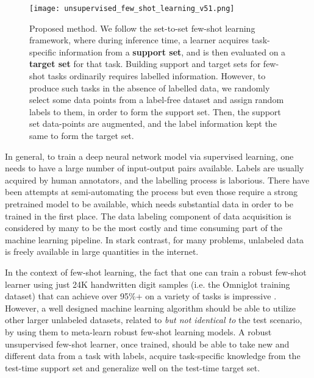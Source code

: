 \documentclass{article}
\begin{document}
\begin{figure}[ht]
    \centering
    \texttt{[image: unsupervised\_few\_shot\_learning\_v51.png]}
    \caption{Proposed method.  We follow the set-to-set \cite{vinyals2016matching} few-shot learning framework, where during inference time, a learner acquires task-specific information from a \textbf{support set}, and is then evaluated on a \textbf{target set} for that task. Building support and target sets for few-shot tasks ordinarily requires labelled information. However, to produce such tasks in the absence of labelled data, we randomly select some data points from a label-free dataset and assign random labels to them, in order to form the support set. Then, the support set data-points are augmented, and the label information kept the same to form the target set.} 
    \label{fig:unsupervised_task_sampling}
\vspace{-7.0mm}
\end{figure}

In general, to train a deep neural network model via supervised learning, one needs to have a large number of input-output pairs available. Labels are usually acquired by human annotators, and the labelling process is laborious. There have been attempts at semi-automating the process \cite{parkhi2015deep} but even those require a strong pretrained model to be available, which needs substantial data in order to be trained in the first place. The data labeling component of data acquisition is considered by many to be the most costly and time consuming part of the machine learning pipeline. In stark contrast, for many problems, unlabeled data is freely available in large quantities in the internet. 

In the context of few-shot learning, the fact that one can train a robust few-shot learner using just 24K handwritten digit samples (i.e. the Omniglot training dataset) that can achieve over 95\%+ on a variety of tasks is impressive \cite{finn2017model,snell2017prototypical,ravi2016optimization,antoniou2018train}. However, a well designed machine learning algorithm should be able to utilize other larger unlabeled datasets, related to \textit{but not identical to} the test scenario, by using them to meta-learn robust few-shot learning models. A robust unsupervised few-shot learner, once trained, should be able to take new and different data from a task with labels, acquire task-specific knowledge from the test-time support set and generalize well on the test-time target set. 
\end{document}
